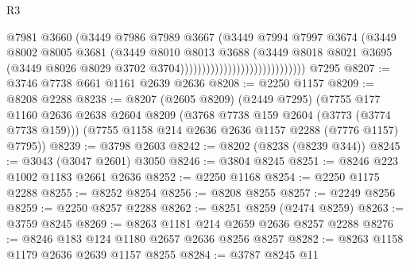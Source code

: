 \begin{lexlean}{R3}
\begin{coremodule}
                                                  @7981
                                                  @3660
                                                  (@3449
                                                    @7986
                                                    @7989
                                                    @3667
                                                    (@3449
                                                      @7994
                                                      @7997
                                                      @3674
                                                      (@3449
                                                        @8002
                                                        @8005
                                                        @3681
                                                        (@3449
                                                          @8010
                                                          @8013
                                                          @3688
                                                          (@3449
                                                            @8018
                                                            @8021
                                                            @3695
                                                            (@3449
                                                              @8026
                                                              @8029
                                                              @3702
                                                              @3704)))))))))))))))))))))))))))))
    @7295
@8207 := @3746 @7738 @661 @1161 @2639 @2636
@8208 := @2250 @1157
@8209 := @8208 @2288
@8238 := @8207
    (@2605 @8209)
    (@2449 @7295)
    (@7755
      @177
      @1160
      @2636
      @2638
      @2604
      @8209
      (@3768 @7738 @159 @2604 (@3773 (@3774 @7738 @159)))
      (@7755 @1158 @214 @2636 @2636 @1157 @2288 (@7776 @1157) @7795))
@8239 := @3798 @2603
@8242 := @8202 (@8238 (@8239 @344))
@8245 := @3043 (@3047 @2601) @3050
@8246 := @3804 @8245
@8251 := @8246 @223 @1002 @1183 @2661 @2636
@8252 := @2250 @1168
@8254 := @2250 @1175 @2288
@8255 := @8252 @8254
@8256 := @8208 @8255
@8257 := @2249 @8256
@8259 := @2250 @8257 @2288
@8262 := @8251 @8259 (@2474 @8259)
@8263 := @3759 @8245
@8269 := @8263 @1181 @214 @2659 @2636 @8257 @2288
@8276 := @8246 @183 @124 @1180 @2657 @2636 @8256 @8257
@8282 := @8263 @1158 @1179 @2636 @2639 @1157 @8255
@8284 := @3787 @8245 @11

\end{coremodule}
\end{lexlean}
